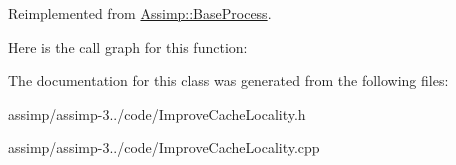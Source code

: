 Reimplemented from \hyperlink{class_assimp_1_1_base_process_aae14d0a8c5918642d4a272b7b74b5d70}{Assimp\+::\+Base\+Process}.



Here is the call graph for this function\+:




The documentation for this class was generated from the following files\+:\begin{DoxyCompactItemize}
\item 
assimp/assimp-\/3../code/Improve\+Cache\+Locality.\+h\item 
assimp/assimp-\/3../code/Improve\+Cache\+Locality.\+cpp\end{DoxyCompactItemize}
